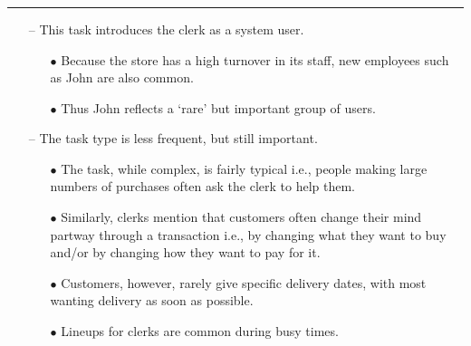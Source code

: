 \documentclass[pdf]{beamer}
\begin{document}
{%
\begin{frame}
\frametitle{\textcolor{myBlue}{{\textbf{\hspace{8mm}{Developing task examples: Cheap Shop}}}}}
\vspace*{-8mm}
\textcolor{red}{\rule{10cm}{1mm}}

\vspace{3mm}
\textcolor{myBlue}{\textbf{\hspace{2mm}{Discussion}}}
\vspace{2mm}
\begin{itemize}
	\item[\textcolor{myBlue}{--}] \textcolor{myBlue}{{\small This task introduces the clerk as a system user.}}
		\begin{itemize}
			\item[\textcolor{myBlue}{$\bullet$}]\textcolor{myBlue}{{\footnotesize Because the store has a high turnover in its staff, new employees such as John are also common. }}
         	\item[\textcolor{myBlue}{$\bullet$}]\textcolor{myBlue}{{\footnotesize Thus John reflects a ‘rare’ but important group of users. }}
		\end{itemize}    
	\vspace{5mm}
	\item[\textcolor{myBlue}{--}] \textcolor{myBlue}{{\small The task type is less frequent, but still important.}}
		\begin{itemize}
       		\item[\textcolor{myBlue}{$\bullet$}]\textcolor{myBlue}{{\footnotesize The task, while complex, is fairly typical i.e., people making large numbers of purchases often ask the clerk to help them.}}
            \item[\textcolor{myBlue}{$\bullet$}]\textcolor{myBlue}{{\footnotesize Similarly, clerks mention that customers often change their mind partway through a transaction i.e., by changing what they want to buy and/or by changing how they want to pay for it.}}
            \item[\textcolor{myBlue}{$\bullet$}]\textcolor{myBlue}{{\footnotesize Customers, however, rarely give specific delivery dates, with most wanting delivery as soon as possible.}}
            \item[\textcolor{myBlue}{$\bullet$}]\textcolor{myBlue}{{\footnotesize Lineups for clerks are common during busy times.}}
     	\end{itemize}
\end{itemize}
\end{frame}}
\end{document}
